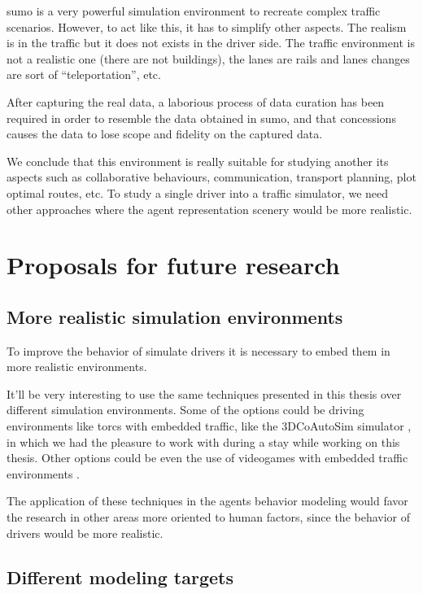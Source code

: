 \gls{sumo} is a very powerful simulation environment to recreate complex traffic scenarios. However, to act like this, it has to simplify other aspects. The realism is in the traffic but it does not exists in the driver side. The traffic environment is not a realistic one (there are not buildings), the lanes are rails and lanes changes are sort of \enquote{teleportation}, etc.

After capturing the real data, a laborious process of data curation has been required in order to resemble the data obtained in \gls{sumo}, and that concessions causes the data to lose scope and fidelity on the captured data.

We conclude that this environment is really suitable for studying another \acrshort{its} aspects such as collaborative behaviours, communication, transport planning, plot optimal routes, etc. To study a single driver into a traffic simulator, we need other approaches where the agent representation scenery would be more realistic.

\section{Proposals for future research}

\subsection{More realistic simulation environments}

To improve the behavior of simulate drivers it is necessary to embed them in more realistic environments.

It'll be very interesting to use the same techniques presented in this thesis over different simulation environments. Some of the options could be driving environments like \ac{torcs} with embedded traffic, like the 3DCoAutoSim simulator \cite{olaverri2018implementation}, in which we had the pleasure to work with during a stay while working on this thesis. Other options could be even the use of videogames with embedded traffic environments \cite{richter2016playing, johnson2017driving}.

The application of these techniques in the agents behavior modeling would favor the research in other areas more oriented to human factors, since the behavior of drivers would be more realistic.

\subsection{Different modeling targets}

